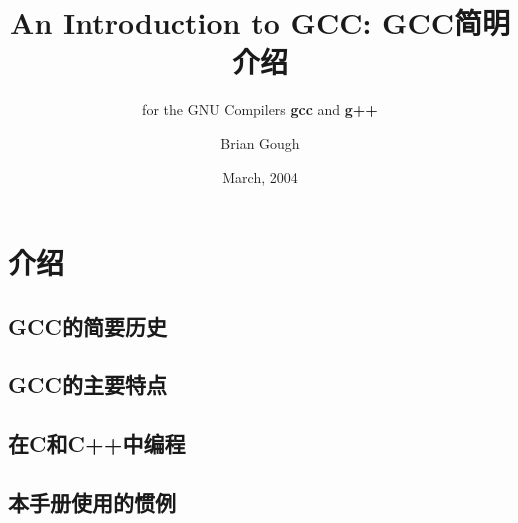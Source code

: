\documentclass[lang=cn,10pt,newtx,scheme=chinese]{elegantbook}
\title{An Introduction to GCC: GCC简明介绍}
\subtitle{for the GNU Compilers \textbf{gcc} and \textbf{g++}}
\author{Brian Gough}
\date{March, 2004}
\begin{document}
\maketitle
\frontmatter

\tableofcontents

\mainmatter

\chapter{介绍}
\section{GCC的简要历史}
\section{GCC的主要特点}
\section{在C和C++中编程}
\section{本手册使用的惯例}
\end{document}

